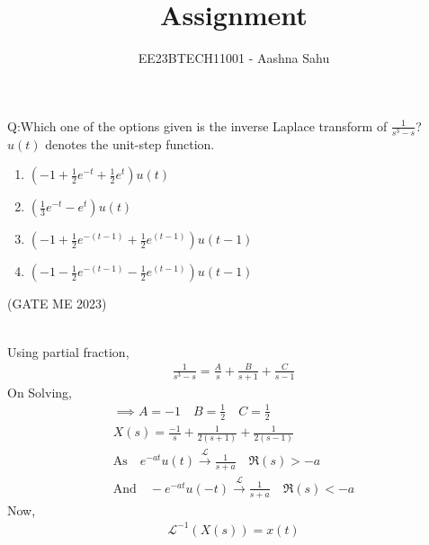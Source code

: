 \documentclass[journal,12pt,onecolumn]{IEEEtran}
\theoremstyle{remark}
\begin{document}
\let\vec\mathbf



\vspace{3cm}
\title{Assignment}
\author{EE23BTECH11001 - Aashna Sahu}
\maketitle
\bigskip

\renewcommand{\thefigure}{\theenumi}
\renewcommand{\thetable}{\theenumi}
Q:Which one of the options given is the inverse Laplace transform of $\frac{1}{s^3-s}$?\\
$u(t)$ denotes the unit-step function.
\begin{enumerate}[label=(\Alph*)]
\item $\left(-1+\frac{1}{2}e^{-t}+\frac{1}{2}e^t\right)u(t)$\\
\item $\left(\frac{1}{3}e^{-t}-e^t\right)u(t)$\\
\item $\left(-1+\frac{1}{2}e^{-(t-1)}+\frac{1}{2}e^{(t-1)}\right)u(t-1)$\\
\item $\left(-1-\frac{1}{2}e^{-(t-1)}-\frac{1}{2}e^{(t-1)}\right)u(t-1)$\\
\end{enumerate}
\hfill(GATE ME 2023)

\solution
\\
Using partial fraction,\\
\begin{align}
\frac{1}{s^3-s}=\frac{A}{s}+\frac{B}{s+1}+\frac{C}{s-1}
\end{align}
On Solving,
\begin{align}
\implies A=-1\quad B=\frac{1}{2} \quad C=\frac{1}{2}\\
X(s)=\frac{-1}{s}+\frac{1}{2(s+1)}+\frac{1}{2(s-1)}\\
\text{As} \quad e^{-at}u(t) \xrightarrow{\mathcal{L}} \frac{1}{s+a}\quad \Re(s)>-a\\
\text{And} \quad -e^{-at}u(-t) \xrightarrow{\mathcal{L}} \frac{1}{s+a}\quad \Re(s)<-a
\end{align}
Now,
\begin{align}
\mathcal{L}^{-1}(X(s))=x(t)
\end{align}
\end{document}
